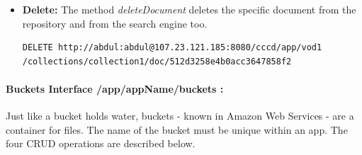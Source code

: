 \begin{itemize}
\item \textbf{Delete:} The method \textit{deleteDocument} deletes the specific document from the repository and from the search engine too.

\begin{code}
\begin{verbatim}
DELETE http://abdul:abdul@107.23.121.185:8080/cccd/app/vod1
/collections/collection1/doc/512d3258e4b0acc3647858f2
\end{verbatim}
\end{code}
 
\end{itemize}
\paragraph{Buckets Interface /app/{appName}/buckets :} Just like a bucket holds water, buckets - known in Amazon Web Services - are a container for files. The name of the bucket must be unique within an app. The four \ac{CRUD} operations are described below.

